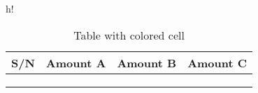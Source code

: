 \documentclass{article}
\begin{document}
	\begin{table}{h!}
	\begin{center}
		\caption{Table with colored cell}
		\label{tab:table 1}
		\begin{tabular}{c|c|c|c}
		\hline	
		\textbf{S/N} & \textbf{Amount A} & \textbf{Amount B} & \textbf{Amount C}\\
		\hline
		\cellcolor{blue}{1} & \cellcolor{green}{25.6773483} & \cellcolor{yellow}{45.666667}\\ & \cellcolor{blue}{32.99888}\\
		\cellcolor{blue}{2} & \cellcolor{green}{45.7837334} & \cellcolor{yellow}{45.1247234} & \cellcolor{blue}{12.56474}\\
		\hline
	\end{tabular}
		
	\end{center}
	\end{table}
\end{document}
